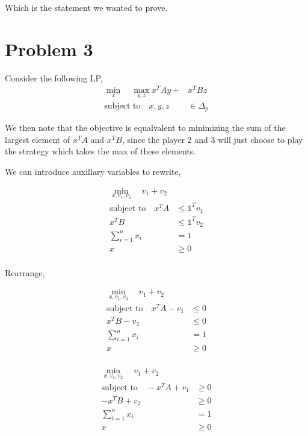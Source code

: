 \documentclass[a4paper]{article}
\begin{document}
Which is the statement we wanted to prove.

\section{Problem 3}

Consider the following LP,
\begin{align*}
	\min_x \quad  \max_{y,z} x^TAy + &x^TBz\\
	\text{subject to} \quad x,y,z &\in \Delta_p
\end{align*}

We then note that the objective is equalvalent to minimizing the sum 
of the largest element of $x^TA$ and $x^TB$, since the player 2 and 3 will 
just choose to play the strategy which takes the max of these elements.

We can introduce auxillary variables to rewrite, 

\begin{align*}
	\min_{x, v_1, v_2} \quad  v_1 + v_2\\
	\text{subject to} \quad x^TA &\leq \mathds{1}^Tv_1\\
							x^TB &\leq \mathds{1}^Tv_2\\
							\sum_{i=1}^nx_i &=1 \\
							x &\geq 0\\
\end{align*}

Rearrange, 

\begin{align*}
	\min_{x, v_1, v_2} \quad  v_1 + v_2\\
	\text{subject to} \quad x^TA - v_1 &\leq 0 \\
							x^TB - v_2 &\leq 0 \\
							\sum_{i=1}^nx_i &=1 \\
							x &\geq 0\\
\end{align*}

\begin{align*}
	\min_{x, v_1, v_2} \quad  v_1 + v_2\\
	\text{subject to} \quad -x^TA + v_1 &\geq 0 \\
							-x^TB + v_2 &\geq 0 \\
							\sum_{i=1}^nx_i &=1 \\
							x &\geq 0\\
\end{align*}
\end{document}
